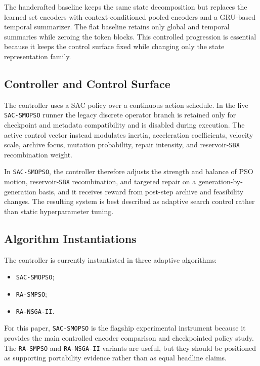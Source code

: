 \documentclass[a4paper,fleqn]{cas-dc}
\begin{document}
The handcrafted baseline keeps the same state decomposition but replaces the learned set encoders with context-conditioned pooled encoders and a GRU-based temporal summarizer. The flat baseline retains only global and temporal summaries while zeroing the token blocks. This controlled progression is essential because it keeps the control surface fixed while changing only the state representation family.

\subsection{Controller and Control Surface}

The controller uses a SAC policy over a continuous action schedule. In the live \texttt{SAC-SMOPSO} runner the legacy discrete operator branch is retained only for checkpoint and metadata compatibility and is disabled during execution. The active control vector instead modulates inertia, acceleration coefficients, velocity scale, archive focus, mutation probability, repair intensity, and reservoir-\texttt{SBX} recombination weight.

In \texttt{SAC-SMOPSO}, the controller therefore adjusts the strength and balance of PSO motion, reservoir-\texttt{SBX} recombination, and targeted repair on a generation-by-generation basis, and it receives reward from post-step archive and feasibility changes. The resulting system is best described as adaptive search control rather than static hyperparameter tuning.

\subsection{Algorithm Instantiations}

The controller is currently instantiated in three adaptive algorithms:
\begin{itemize}
\item \texttt{SAC-SMOPSO};
\item \texttt{RA-SMPSO};
\item \texttt{RA-NSGA-II}.
\end{itemize}

For this paper, \texttt{SAC-SMOPSO} is the flagship experimental instrument because it provides the main controlled encoder comparison and checkpointed policy study. The \texttt{RA-SMPSO} and \texttt{RA-NSGA-II} variants are useful, but they should be positioned as supporting portability evidence rather than as equal headline claims.
\end{document}
